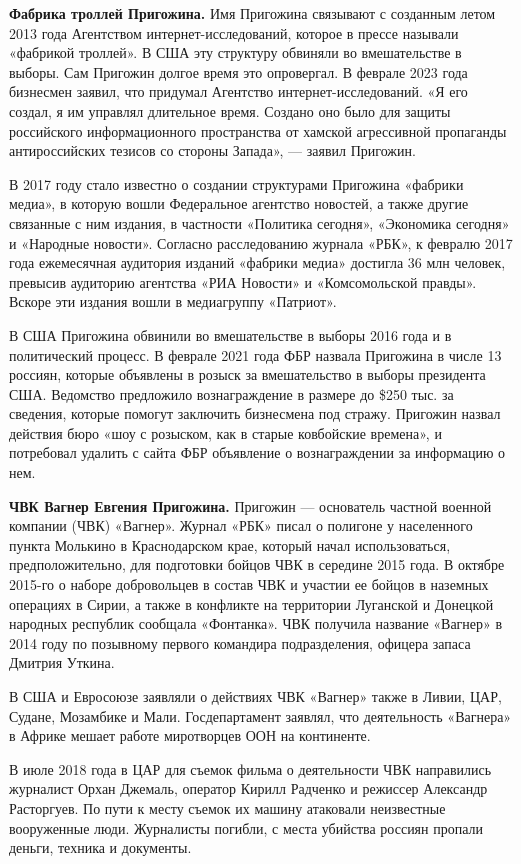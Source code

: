 \textbf{Фабрика троллей Пригожина.} Имя Пригожина связывают с созданным летом 2013 года Агентством интернет-исследований, которое в прессе называли «фабрикой троллей». В США эту структуру обвиняли во вмешательстве в выборы. Сам Пригожин долгое время это опровергал. В феврале 2023 года бизнесмен заявил, что придумал Агентство интернет-исследований. «Я его создал, я им управлял длительное время. Создано оно было для защиты российского информационного пространства от хамской агрессивной пропаганды антироссийских тезисов со стороны Запада», --- заявил Пригожин.

В 2017 году стало известно о создании структурами Пригожина «фабрики медиа», в которую вошли Федеральное агентство новостей, а также другие связанные с ним издания, в частности «Политика сегодня», «Экономика сегодня» и «Народные новости». Согласно расследованию журнала «РБК», к февралю 2017 года ежемесячная аудитория изданий «фабрики медиа» достигла 36 млн человек, превысив аудиторию агентства «РИА Новости» и «Комсомольской правды». Вскоре эти издания вошли в медиагруппу «Патриот».

В США Пригожина обвинили во вмешательстве в выборы 2016 года и в политический процесс. В феврале 2021 года ФБР назвала Пригожина в числе 13 россиян, которые объявлены в розыск за вмешательство в выборы президента США. Ведомство предложило вознаграждение в размере до \$250 тыс. за сведения, которые помогут заключить бизнесмена под стражу. Пригожин назвал действия бюро «шоу с розыском, как в старые ковбойские времена», и потребовал удалить с сайта ФБР объявление о вознаграждении за информацию о нем.

\textbf{ЧВК Вагнер Евгения Пригожина.} Пригожин — основатель частной военной компании (ЧВК) «Вагнер». Журнал «РБК» писал о полигоне у населенного пункта Молькино в Краснодарском крае, который начал использоваться, предположительно, для подготовки бойцов ЧВК в середине 2015 года. В октябре 2015-го о наборе добровольцев в состав ЧВК и участии ее бойцов в наземных операциях в Сирии, а также в конфликте на территории Луганской и Донецкой народных республик сообщала «Фонтанка». ЧВК получила название «Вагнер» в 2014 году по позывному первого командира подразделения, офицера запаса Дмитрия Уткина.

В США и Евросоюзе заявляли о действиях ЧВК «Вагнер» также в Ливии, ЦАР, Судане, Мозамбике и Мали. Госдепартамент заявлял, что деятельность «Вагнера» в Африке мешает работе миротворцев ООН на континенте.

В июле 2018 года в ЦАР для съемок фильма о деятельности ЧВК направились журналист Орхан Джемаль, оператор Кирилл Радченко и режиссер Александр Расторгуев. По пути к месту съемок их машину атаковали неизвестные вооруженные люди. Журналисты погибли, с места убийства россиян пропали деньги, техника и документы.

